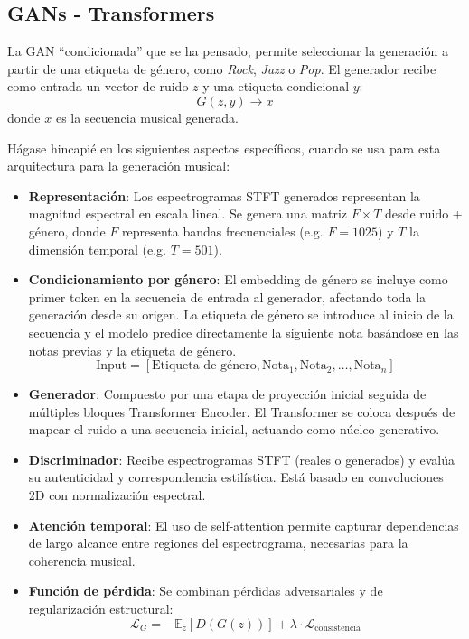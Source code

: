 \subsection{GANs - Transformers}

La GAN ``condicionada'' que se ha pensado, permite seleccionar la generación a partir de una etiqueta de género, como \textit{Rock}, \textit{Jazz} o \textit{Pop}. El generador recibe como entrada un vector de ruido \( z \) y una etiqueta condicional \( y \):
\[
G(z, y) \rightarrow x
\]
donde \( x \) es la secuencia musical generada. 

Hágase hincapié en los siguientes aspectos específicos, cuando se usa para esta arquitectura para la generación musical:

\begin{itemize}
  \item \textbf{Representación}: Los espectrogramas STFT generados representan la magnitud espectral en escala lineal. Se genera una matriz $F \times T$ desde ruido + género, donde $F$ representa bandas frecuenciales (e.g. $F=1025$) y $T$ la dimensión temporal (e.g. $T=501$).
  \item \textbf{Condicionamiento por género}: El embedding de género se incluye como primer token en la secuencia de entrada al generador, afectando toda la generación desde su origen.
  La etiqueta de género se introduce al inicio de la secuencia y el modelo predice directamente la siguiente nota basándose en las notas previas y la etiqueta de género.
    \[
    \text{Input} = [\text{Etiqueta de género}, \text{Nota}_1, \text{Nota}_2, \ldots, \text{Nota}_n]
    \]
  \item \textbf{Generador}: Compuesto por una etapa de proyección inicial seguida de múltiples bloques Transformer Encoder. El Transformer se coloca después de mapear el ruido a una secuencia inicial, actuando como núcleo generativo.
  \item \textbf{Discriminador}: Recibe espectrogramas STFT (reales o generados) y evalúa su autenticidad y correspondencia estilística. Está basado en convoluciones 2D con normalización espectral.
  \item \textbf{Atención temporal}: El uso de self-attention permite capturar dependencias de largo alcance entre regiones del espectrograma, necesarias para la coherencia musical.
  \item \textbf{Función de pérdida}: Se combinan pérdidas adversariales y de regularización estructural:
    \[
    \mathcal{L}_G = -\mathbb{E}_{z}[D(G(z))] + \lambda \cdot \mathcal{L}_{\text{consistencia}}
\]
\end{itemize}
